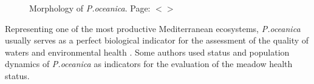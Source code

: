 \documentclass[11pt]{article}
\begin{document}
\begin{figure}[H]
	\centering
	\caption{Morphology of \textit{P.oceanica}. Page: $<$\pageref{page-5}$>$}\label{fig:8}
\end{figure}

Representing one of the most productive Mediterranean ecosystems, \textit{P.oceanica} usually serves as a
perfect biological indicator for the assessment of the quality of waters and environmental health
\cite{Boudouresque89}\label{Boudouresque89}. Some authors \cite{Guidetti08,Montefalcone09}\label{Guidetti08} \label{Montefalcone09} used status and population dynamics of \textit{P.oceanica} as indicators for the evaluation of the meadow health status. 
\end{document}
